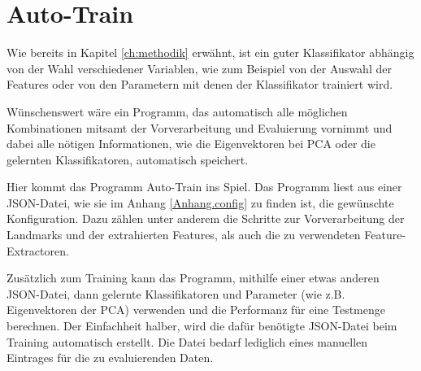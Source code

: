 \section{Auto-Train}
Wie bereits in Kapitel \ref{ch:methodik} erwähnt, ist ein guter Klassifikator abhängig von der Wahl verschiedener Variablen, wie zum Beispiel
von der Auswahl der Features oder von den Parametern mit denen der Klassifikator trainiert wird.

Wünschenswert wäre ein Programm, das automatisch alle möglichen Kombinationen mitsamt der Vorverarbeitung und Evaluierung vornimmt und dabei alle nötigen Informationen, wie die Eigenvektoren bei PCA oder die gelernten Klassifikatoren, automatisch speichert.

Hier kommt das Programm Auto-Train ins Spiel. Das Programm liest aus einer JSON-Datei, wie sie im Anhang \ref{Anhang.config} zu finden ist, die gewünschte Konfiguration. Dazu zählen unter anderem die Schritte zur Vorverarbeitung der Landmarks und der extrahierten Features, als auch die zu verwendeten Feature-Extractoren. 

Zusätzlich zum Training kann das Programm, mithilfe einer etwas anderen JSON-Datei, dann gelernte Klassifikatoren und Parameter (wie z.B. Eigenvektoren der PCA) verwenden und die Performanz für eine Testmenge berechnen.
Der Einfachheit halber, wird die dafür benötigte JSON-Datei beim Training automatisch erstellt. Die Datei bedarf lediglich eines manuellen Eintrages für die zu evaluierenden Daten.





